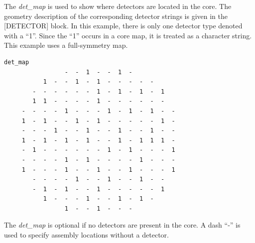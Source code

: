 The {\it det\_map} is used to show where detectors are located in the core.  The geometry description
of the corresponding detector strings is given in the [DETECTOR] block.  In this example,
there is only one detector type denoted with a ``1''.  Since the ``1'' occurs in a core map,
it is treated as a character string.  This example uses a full-symmetry map.
\begin{Verbatim}[fontsize=\small]
  det_map
                 -  -  1  -  -  1  -
           1  -  -  1  -  1  -  -  -  -  -
        -  -  -  -  -  -  1  -  1  -  1  -  1
        1  1  -  -  -  -  1  -  -  -  -  -  -
     -  -  -  -  1  -  -  -  1  -  1  -  1  -  -
     1  -  1  -  -  1  -  1  -  -  -  -  -  1  -
     -  -  -  1  -  -  1  -  -  1  -  -  1  -  -
     1  -  1  -  1  -  1  -  -  1  -  1  1  1  -
     -  1  -  -  -  -  -  -  1  -  1  -  -  -  1
     -  -  -  -  1  -  1  -  -  -  -  1  -  -  -
     1  -  -  -  1  -  -  1  -  -  1  -  -  -  1
        -  -  -  -  1  -  -  1  -  -  1  -  -
        -  1  -  1  -  -  1  -  -  -  -  -  1
           1  -  -  -  1  -  -  1  -  1  -
                 1  -  -  1  -  -  -
\end{Verbatim}
The {\it det\_map} is optional if no detectors are present in the core.
A dash ``-'' is used to specify assembly locations without a detector.


